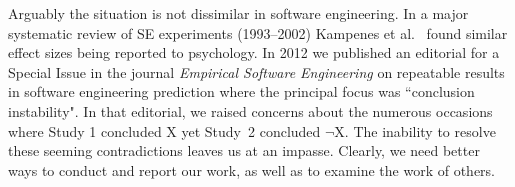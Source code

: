\documentclass[10pt]{elsarticle}
\begin{document}
Arguably the situation is not  dissimilar in software engineering.  In a major systematic review of SE experiments (1993--2002) Kampenes et al.~\cite{Kamp07} found similar effect sizes being reported to psychology. In 2012 we published an editorial for a Special Issue in the journal \textit{Empirical Software Engineering} on repeatable results in software engineering prediction \cite{menzies12} where the principal focus was ``conclusion instability".  In that editorial, we raised concerns about the numerous occasions where Study 1 concluded X yet Study~2 concluded $\neg$X.  The inability to resolve these seeming contradictions leaves us at an impasse.  Clearly, we need better ways to conduct and report our work, as well as to examine the work of others.


\end{document}
